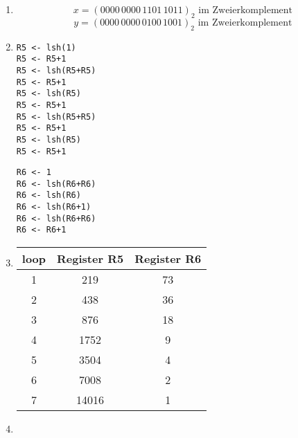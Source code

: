 \documentclass[a4paper, 12pt, margins=2cm]{homework}
\begin{document}
\begin{solution}
\begin{enumerate}[label=(\alph*)]
      \item \hfill

        \[ x = (0000\,0000\,1101\,1011)_2 \text{ im Zweierkomplement} \]
        \[ y = (0000\,0000\,0100\,1001)_2 \text{ im Zweierkomplement} \]
\newpage
      \item \hfill

      \begin{center}
        \begin{minipage}{0.4\textwidth}
          \begin{lstlisting}[frame=single]
R5 <- lsh(1)
R5 <- R5+1
R5 <- lsh(R5+R5)
R5 <- R5+1
R5 <- lsh(R5)
R5 <- R5+1
R5 <- lsh(R5+R5)
R5 <- R5+1
R5 <- lsh(R5)
R5 <- R5+1\end{lstlisting}
        \end{minipage}
        \hspace*{1cm}
        \begin{minipage}{0.4\textwidth}
          \begin{lstlisting}[frame=single]
R6 <- 1
R6 <- lsh(R6+R6)
R6 <- lsh(R6)
R6 <- lsh(R6+1)
R6 <- lsh(R6+R6)
R6 <- R6+1\end{lstlisting}
        \end{minipage}
      \end{center}

      \item \hfill

      \begin{center}
        \begin{tabular}{|c|c|c|}
          \hline
          loop & Register R5 & Register R6 \\ \hline \hline
          1    & 219         & 73          \\ \hline
          2    & 438         & 36          \\ \hline
          3    & 876         & 18          \\ \hline
          4    & 1752        & 9           \\ \hline
          5    & 3504        & 4           \\ \hline
          6    & 7008        & 2           \\ \hline
          7    & 14016       & 1           \\ \hline
        \end{tabular}
      \end{center}

      \item \hfill



\end{enumerate}
\end{solution}
\end{document}
